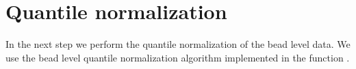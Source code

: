 \section{Quantile normalization}
In the next step we perform the quantile normalization of the bead level data. We use the bead level quantile normalization algorithm implemented in the function .